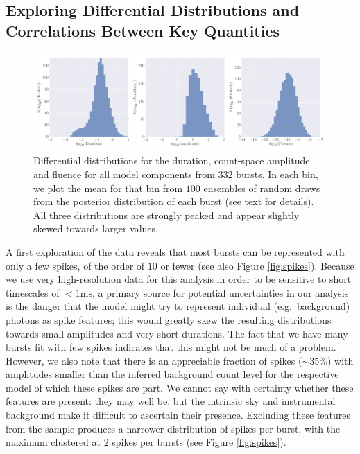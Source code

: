 \documentclass[12pt]{emulateapj}
\begin{document}
\subsection{Exploring Differential Distributions and Correlations Between Key Quantities}
\label{ch6:exploration}
  \begin{figure}[htbp]
\begin{center}
\includegraphics[width=\textwidth]{ch6f5.pdf}%
\caption{Differential distributions for the duration, count-space amplitude and fluence for all model components from $332$ bursts. In each bin, we plot the mean for
that bin from $100$ ensembles of random draws from the posterior distribution of each burst (see text for details). All three distributions are strongly peaked and appear slightly 
skewed towards larger values. }
\label{fig:diffdist}
\end{center}
\end{figure}
A first exploration of the data reveals that most bursts can be represented with only a few spikes, of the order of 
$10$ or fewer (see also Figure \ref{fig:spikes}). Because we use very high-resolution data for this analysis in order to
be sensitive to short timescales of $< 1\mathrm{ms}$, a primary source for potential uncertainties in our analysis is the
danger that the model might try to represent individual (e.g.\ background) photons as spike features; this would greatly
skew the resulting distributions towards small amplitudes and very short durations. The fact that we have many bursts
fit with few spikes indicates that this might not be much of a problem. However, we also note that there is an appreciable fraction
of spikes ($\sim 35\%$) with amplitudes smaller than the inferred background count level for the respective model of which these spikes 
are part. We cannot say with certainty whether these features are present: they may well be, but the intrinsic sky and instrumental background
 make it difficult to ascertain their presence. Excluding these features from the sample produces a narrower distribution
of spikes per burst, with the maximum clustered at $2$ spikes per bursts (see Figure \ref{fig:spikes}).
\end{document}
